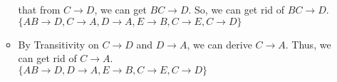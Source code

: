 \documentclass[12pt]{article}
\begin{document}
\begin{enumerate}
\begin{itemize}
            that from $C \longrightarrow D$, we can get $BC \longrightarrow D$.
            So, we can get rid of $BC \longrightarrow D$. \\
            $\{AB \longrightarrow D, C \longrightarrow A, D \longrightarrow A, E
            \longrightarrow B, C \longrightarrow E, C \longrightarrow D\}$
      \item By Transitivity on $C \longrightarrow D$ and $D \longrightarrow A$,
            we can derive $C \longrightarrow A$. Thus, we can get rid of $C
            \longrightarrow A$. \\
            $\{AB \longrightarrow D, D \longrightarrow A, E \longrightarrow B, C
            \longrightarrow E, C \longrightarrow D\}$
    \end{itemize}
  
  

\end{enumerate}
\end{document}
